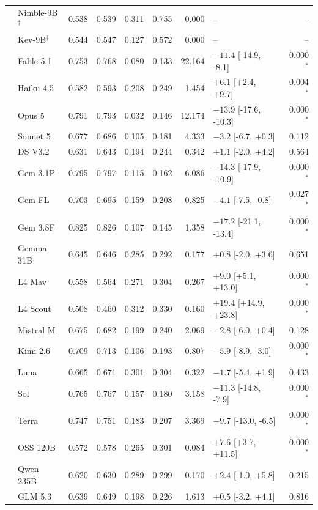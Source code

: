 \begin{longtable}{llrrrrrlr}
 & Nimble-9B$^{\dagger}$ & 0.538 & 0.539 & 0.311 & 0.755 & 0.000 & -- & -- \\
 & Kev-9B$^{\dagger}$ & 0.544 & 0.547 & 0.127 & 0.572 & 0.000 & -- & -- \\
 & Fable 5.1 & 0.753 & 0.768 & 0.080 & 0.133 & 22.164 & $-11.4$ [-14.9, -8.1] & 0.000$^{*}$ \\
 & Haiku 4.5 & 0.582 & 0.593 & 0.208 & 0.249 & 1.454 & $+6.1$ [+2.4, +9.7] & 0.004$^{*}$ \\
 & Opus 5 & 0.791 & 0.793 & 0.032 & 0.146 & 12.174 & $-13.9$ [-17.6, -10.3] & 0.000$^{*}$ \\
 & Sonnet 5 & 0.677 & 0.686 & 0.105 & 0.181 & 4.333 & $-3.2$ [-6.7, +0.3] & 0.112 \\
 & DS V3.2 & 0.631 & 0.643 & 0.194 & 0.244 & 0.342 & $+1.1$ [-2.0, +4.2] & 0.564 \\
 & Gem 3.1P & 0.795 & 0.797 & 0.115 & 0.162 & 6.086 & $-14.3$ [-17.9, -10.9] & 0.000$^{*}$ \\
 & Gem FL & 0.703 & 0.695 & 0.159 & 0.208 & 0.825 & $-4.1$ [-7.5, -0.8] & 0.027$^{*}$ \\
 & Gem 3.8F & 0.825 & 0.826 & 0.107 & 0.145 & 1.358 & $-17.2$ [-21.1, -13.4] & 0.000$^{*}$ \\
 & Gemma 31B & 0.645 & 0.646 & 0.285 & 0.292 & 0.177 & $+0.8$ [-2.0, +3.6] & 0.651 \\
 & L4 Mav & 0.558 & 0.564 & 0.271 & 0.304 & 0.267 & $+9.0$ [+5.1, +13.0] & 0.000$^{*}$ \\
 & L4 Scout & 0.508 & 0.460 & 0.312 & 0.330 & 0.160 & $+19.4$ [+14.9, +23.8] & 0.000$^{*}$ \\
 & Mistral M & 0.675 & 0.682 & 0.199 & 0.240 & 2.069 & $-2.8$ [-6.0, +0.4] & 0.128 \\
 & Kimi 2.6 & 0.709 & 0.713 & 0.106 & 0.193 & 0.807 & $-5.9$ [-8.9, -3.0] & 0.000$^{*}$ \\
 & Luna & 0.665 & 0.671 & 0.301 & 0.304 & 0.322 & $-1.7$ [-5.4, +1.9] & 0.433 \\
 & Sol & 0.765 & 0.767 & 0.157 & 0.180 & 3.158 & $-11.3$ [-14.8, -7.9] & 0.000$^{*}$ \\
 & Terra & 0.747 & 0.751 & 0.183 & 0.207 & 3.369 & $-9.7$ [-13.0, -6.5] & 0.000$^{*}$ \\
 & OSS 120B & 0.572 & 0.578 & 0.265 & 0.301 & 0.084 & $+7.6$ [+3.7, +11.5] & 0.000$^{*}$ \\
 & Qwen 235B & 0.620 & 0.630 & 0.289 & 0.299 & 0.170 & $+2.4$ [-1.0, +5.8] & 0.215 \\
 & GLM 5.3 & 0.639 & 0.649 & 0.198 & 0.226 & 1.613 & $+0.5$ [-3.2, +4.1] & 0.816 \\

\end{longtable}
